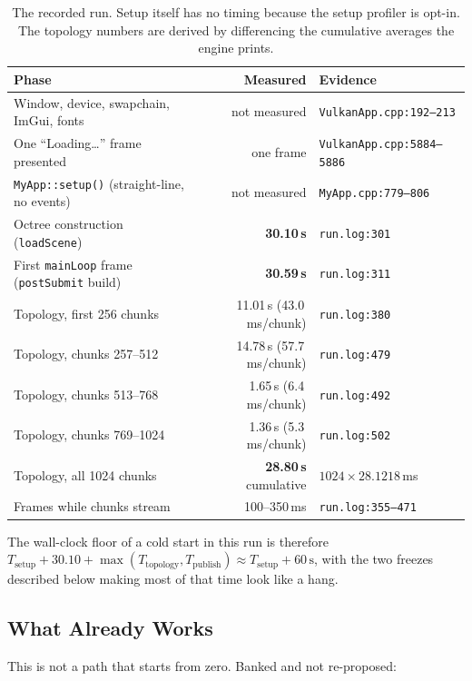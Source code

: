 \documentclass[11pt,a4paper]{article}
\begin{document}
\begin{table}[h]
\centering
\footnotesize
\begin{tabular}{@{}L{6.6cm}rL{5.4cm}@{}}
\toprule
\textbf{Phase} & \textbf{Measured} & \textbf{Evidence} \\
\midrule
Window, device, swapchain, ImGui, fonts & not measured & \texttt{VulkanApp.cpp:192--213} \\
One ``Loading\ldots'' frame presented & one frame & \texttt{VulkanApp.cpp:5884--5886} \\
\texttt{MyApp::setup()} (straight-line, no events) & not measured & \texttt{MyApp.cpp:779--806} \\
Octree construction (\texttt{loadScene}) & \textbf{30.10\,s} & \texttt{run.log:301} \\
First \texttt{mainLoop} frame (\texttt{postSubmit} build) & \textbf{30.59\,s} & \texttt{run.log:311} \\
Topology, first 256 chunks & 11.01\,s (43.0\,ms/chunk) & \texttt{run.log:380} \\
Topology, chunks 257--512 & 14.78\,s (57.7\,ms/chunk) & \texttt{run.log:479} \\
Topology, chunks 513--768 & 1.65\,s (6.4\,ms/chunk) & \texttt{run.log:492} \\
Topology, chunks 769--1024 & 1.36\,s (5.3\,ms/chunk) & \texttt{run.log:502} \\
Topology, all 1024 chunks & \textbf{28.80\,s} cumulative & $1024\times28.1218$\,ms \\
Frames while chunks stream & 100--350\,ms & \texttt{run.log:355--471} \\
\bottomrule
\end{tabular}
\caption{The recorded run. Setup itself has no timing because the setup
profiler is opt-in. The topology numbers are derived by differencing the
cumulative averages the engine prints.}
\end{table}

The wall-clock floor of a cold start in this run is therefore
$T_{\mathrm{setup}} + 30.10 + \max(T_{\mathrm{topology}},
T_{\mathrm{publish}}) \approx T_{\mathrm{setup}} + 60\,\mathrm{s}$, with the
two freezes described below making most of that time look like a hang.

\subsection{What Already Works}

This is not a path that starts from zero. Banked and not re-proposed:
\end{document}

